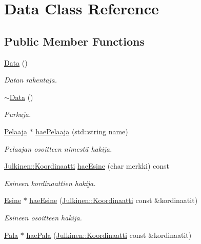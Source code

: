 \hypertarget{class_data}{}\section{Data Class Reference}
\label{class_data}
\subsection*{Public Member Functions}
\begin{DoxyCompactItemize}
\item 
\hyperlink{class_data_af11f741cb7f587e2e495452a8905a22a}{Data} ()
\begin{DoxyCompactList}\small\item\em Datan rakentaja. \end{DoxyCompactList}\item 
\hyperlink{class_data_aab31956423290f0d62dcca47ab4d16dd}{$\sim$\+Data} ()
\begin{DoxyCompactList}\small\item\em Purkaja. \end{DoxyCompactList}\item 
\hyperlink{class_pelaaja}{Pelaaja} $\ast$ \hyperlink{class_data_a6f101f9a140fab0da6bac6dec96e491d}{hae\+Pelaaja} (std\+::string name)
\begin{DoxyCompactList}\small\item\em Pelaajan osoitteen nimestä hakija. \end{DoxyCompactList}\item 
\hyperlink{class_julkinen_1_1_koordinaatti}{Julkinen\+::\+Koordinaatti} \hyperlink{class_data_a8edef6853dc63d894651b5413b9da87b}{hae\+Esine} (char merkki) const 
\begin{DoxyCompactList}\small\item\em Esineen kordinaattien hakija. \end{DoxyCompactList}\item 
\hyperlink{class_esine}{Esine} $\ast$ \hyperlink{class_data_a1d86d15d120a5451f2dfdf2b1644056e}{hae\+Esine} (\hyperlink{class_julkinen_1_1_koordinaatti}{Julkinen\+::\+Koordinaatti} const \&kordinaatit)
\begin{DoxyCompactList}\small\item\em Esineen osoitteen hakija. \end{DoxyCompactList}\item 
\hyperlink{class_pala}{Pala} $\ast$ \hyperlink{class_data_a05494446c31564a36f0b6a09a743420c}{hae\+Pala} (\hyperlink{class_julkinen_1_1_koordinaatti}{Julkinen\+::\+Koordinaatti} const \&kordinaatit)

\end{DoxyCompactItemize}
